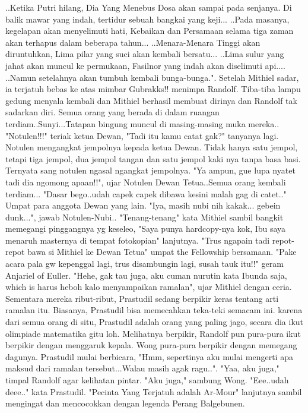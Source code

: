 \documentclass[a4paper,11pt,final]{article}
\begin{document}
..Ketika Putri hilang, Dia Yang Menebus Dosa akan sampai pada senjanya. Di balik mawar yang indah, tertidur sebuah bangkai yang keji...
..Pada masanya, kegelapan akan menyelimuti hati, Kebaikan dan Persamaan selama tiga zaman akan terhapus dalam beberapa tahun...
..Menara-Menara Tinggi akan diruntuhkan, Lima pilar yang suci akan kembali bersatu...
..Lima sulur yang jahat akan muncul ke permukaan, Fasilnor yang indah akan diselimuti api....
..Namun setelahnya akan tumbuh kembali bunga-bunga.".
Setelah Mithiel sadar, ia terjatuh bebas ke atas mimbar Gubrakks!! menimpa Randolf.
Tiba-tiba lampu gedung menyala kembali dan Mithiel berhasil membuat dirinya dan Randolf tak sadarkan diri.
Semua orang yang berada di dalam ruangan terdiam..Sunyi...Tatapan bingung muncul di masing-masing muka mereka..
"Notulen!!!" teriak ketua Dewan, "Tadi itu kamu catat gak?" tanyanya lagi.
Notulen mengangkat jempolnya kepada ketua Dewan.
Tidak hanya satu jempol, tetapi tiga jempol, dua jempol tangan dan satu jempol kaki nya tanpa basa basi.
Ternyata sang notulen ngasal ngangkat jempolnya. "Ya ampun, gue lupa nyatet tadi dia ngomong apaan!!", ujar Notulen Dewan Tetua..Semua orang kembali terdiam...
"Dasar bego..udah capek capek dibawa kesini malah gag di catet.." Umpat para anggota Dewan yang lain.
"Iya, masih nubi nih kakak... gebein dunk...", jawab Notulen-Nubi..
"Tenang-tenang" kata Mithiel sambil bangkit memegangi pinggangnya yg keseleo, "Saya punya hardcopy-nya kok, Ibu saya menaruh masternya di tempat fotokopian" lanjutnya.
"Trus ngapain tadi repot-repot bawa si Mithiel ke Dewan Tetua" umpat the Fellowship bersamaan.
"Pake acara pala gw kepenggal lagi, trus disambungin lagi, susah tauk itu!!" geram Anjariel of Euller.
"Hehe, gak tau juga, aku cuman nurutin kata Ibunda saja, which is harus heboh kalo menyampaikan ramalan", ujar Mithiel dengan ceria.
Sementara mereka ribut-ribut, Prastudil sedang berpikir keras tentang arti ramalan itu. Biasanya, Prastudil bisa memecahkan teka-teki semacam ini.
karena dari semua orang di situ, Prastudil adalah orang yang paling jago, secara dia ikut olimpiade matematika gitu loh.
Melihatnya berpikir, Randolf pun pura-pura ikut berpikir dengan menggaruk kepala. Wong pura-pura berpikir dengan memegang dagunya.
Prastudil mulai berbicara, "Hmm, sepertinya aku mulai mengerti apa maksud dari ramalan tersebut...Walau masih agak ragu..".
"Yaa, aku juga," timpal Randolf agar kelihatan pintar. "Aku juga," sambung Wong.
"Eee..udah deee.." kata Prastudil. "Pecinta Yang Terjatuh adalah Ar-Mour" lanjutnya sambil mengingat dan mencocokkan dengan legenda Perang Balgebunen.
\end{document}
